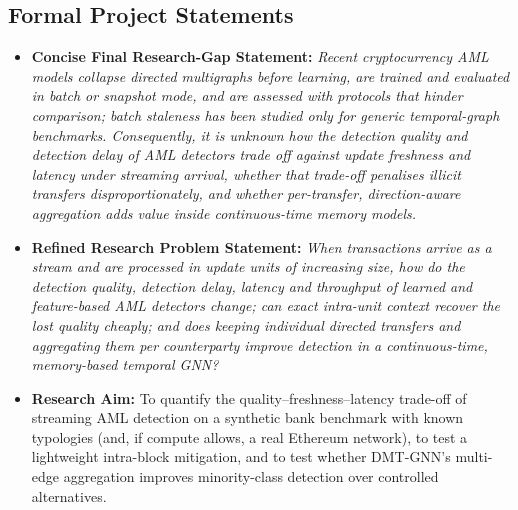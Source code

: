 \documentclass[11pt,a4paper]{article}
\begin{document}
\subsection{Formal Project Statements}
\begin{itemize}[leftmargin=*]
    \item \textbf{Concise Final Research-Gap Statement:}
    \textit{Recent cryptocurrency AML models collapse directed multigraphs before learning, are trained and evaluated in batch or snapshot mode, and are assessed with protocols that hinder comparison; batch staleness has been studied only for generic temporal-graph benchmarks. Consequently, it is unknown how the detection quality and detection delay of AML detectors trade off against update freshness and latency under streaming arrival, whether that trade-off penalises illicit transfers disproportionately, and whether per-transfer, direction-aware aggregation adds value inside continuous-time memory models.}

    \item \textbf{Refined Research Problem Statement:}
    \textit{When transactions arrive as a stream and are processed in update units of increasing size, how do the detection quality, detection delay, latency and throughput of learned and feature-based AML detectors change; can exact intra-unit context recover the lost quality cheaply; and does keeping individual directed transfers and aggregating them per counterparty improve detection in a continuous-time, memory-based temporal GNN?}

    \item \textbf{Research Aim:}
    To quantify the quality--freshness--latency trade-off of streaming AML detection on a synthetic bank benchmark with known typologies (and, if compute allows, a real Ethereum network), to test a lightweight intra-block mitigation, and to test whether DMT-GNN's multi-edge aggregation improves minority-class detection over controlled alternatives.


\end{itemize}
\end{document}
